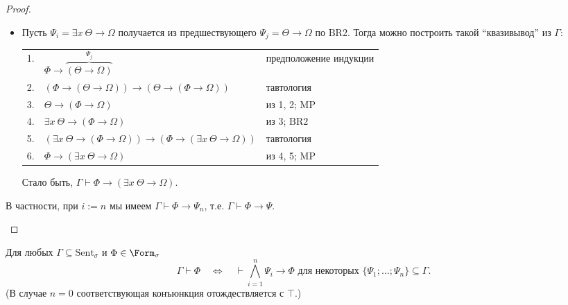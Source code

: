 \documentclass[12pt,a4paper]{article}
\newcommand{\Sent}{\ensuremath{\mathrm{Sent}}\xspace}
\begin{document}
\begin{proof}
\begin{itemize}
\begin{itemize}
                        
                    \item Пусть $\Psi_i = \exists x\ \Theta \rightarrow \Omega$ получается из предшествующего $\Psi_j = \Theta \rightarrow \Omega$ по $\mathrm{BR2}$. Тогда можно построить такой ``квазивывод'' из $\Gamma$:
                        \begin{center}
                            \begin{tabular}{rll}
                                1.& $\Phi \rightarrow \overbrace{(\Theta \rightarrow \Omega)}^{\Psi_j}$& предположение индукции\\
                                2.& $(\Phi \rightarrow (\Theta \rightarrow \Omega)) \rightarrow (\Theta \rightarrow (\Phi \rightarrow \Omega))$& тавтология\\
                                3.& $\Theta \rightarrow (\Phi \rightarrow \Omega)$& из 1, 2; $\mathrm{MP}$\\
                                4.& $\exists x\ \Theta \rightarrow (\Phi \rightarrow \Omega)$& из 3; $\mathrm{BR2}$\\
                                5.& $(\exists x\ \Theta \rightarrow (\Phi \rightarrow \Omega)) \rightarrow (\Phi \rightarrow (\exists x\ \Theta \rightarrow \Omega))$& тавтология\\
                                6.& $\Phi \rightarrow (\exists x\ \Theta \rightarrow \Omega)$& из 4, 5; $\mathrm{MP}$\\
                            \end{tabular}
                        \end{center}
                        Стало быть, $\Gamma \vdash \Phi \rightarrow (\exists x\ \Theta \rightarrow \Omega)$.
                \end{itemize}
                В частности, при $i := n$ мы имеем $\Gamma \vdash \Phi \rightarrow \Psi_n$, т.е. $\Gamma \vdash \Phi \rightarrow \Psi$.
        \end{itemize}
    \end{proof}

    \begin{corollary}
        Для любых $\Gamma \subseteq \Sent_\sigma$ и $\Phi \in \Form_\sigma$
        \[
            \Gamma \vdash \Phi
            \quad \Longleftrightarrow \quad
            \vdash \bigwedge_{i=1}^n \Psi_i \rightarrow \Phi \text{ для некоторых } \{\Psi_1; \dots; \Psi_n\} \subseteq \Gamma.
        \]
        (В случае $n=0$ соответствующая конъюнкция отождествляется с $\top$.)
    \end{corollary}
    
\end{document}
